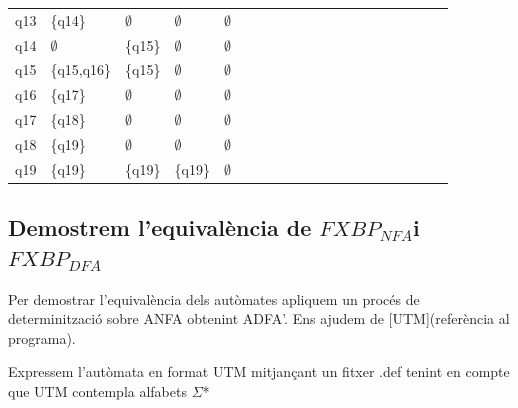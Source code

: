 \documentclass[12pt,a4paper]{report}
\def \dfa{$FXBP_{DFA} $}
\def \nfa{$FXBP_{NFA} $}
\begin{document}
\begin{center}
\begin{table}[ht]
\begin{tabular}{ l l l l l l l l l l l l l l l l l l l l }
q13   & \{q14\}     & $\emptyset$ & $\emptyset$            & $\emptyset$             &  &  &  &  &  &  &  &  &  &  &  &  &  &  &  \\
q14   & $\emptyset$ & \{q15\}     & $\emptyset$            & $\emptyset$             &  &  &  &  &  &  &  &  &  &  &  &  &  &  &  \\
q15   & \{q15,q16\} & \{q15\}     & $\emptyset$            & $\emptyset$             &  &  &  &  &  &  &  &  &  &  &  &  &  &  &  \\
q16   & \{q17\}     & $\emptyset$ & $\emptyset$            & $\emptyset$             &  &  &  &  &  &  &  &  &  &  &  &  &  &  &  \\
q17   & \{q18\}     & $\emptyset$ & $\emptyset$            & $\emptyset$             &  &  &  &  &  &  &  &  &  &  &  &  &  &  &  \\
q18   & \{q19\}     & $\emptyset$ & $\emptyset$            & $\emptyset$             &  &  &  &  &  &  &  &  &  &  &  &  &  &  &  \\
q19   & \{q19\}     & \{q19\}     & \{q19\}                & $\emptyset$ &  &  &  &  &  &  &  &  &  &  &  &  &  &  & \\ \hline

\end{tabular}
\end{table}

\end{center}

\subsection{Demostrem l’equivalència de \nfa i \dfa}

Per demostrar l’equivalència dels autòmates apliquem un procés de determinització sobre ANFA obtenint ADFA’. Ens ajudem de [UTM](referència al programa).

Expressem l’autòmata en format UTM mitjançant un fitxer .def tenint en compte que UTM contempla alfabets $\Sigma$*
\end{document}
